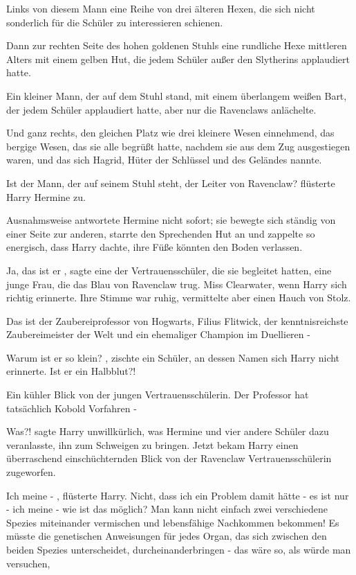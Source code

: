 Links von diesem Mann eine Reihe von drei älteren Hexen, die sich nicht
sonderlich für die Schüler zu interessieren schienen.

Dann zur rechten Seite des hohen goldenen Stuhls eine rundliche Hexe mittleren
Alters mit einem gelben Hut, die jedem Schüler außer den Slytherins applaudiert
hatte.

Ein kleiner Mann, der auf dem Stuhl stand, mit einem überlangem weißen Bart, der
jedem Schüler applaudiert hatte, aber nur die Ravenclaws anlächelte.

Und ganz rechts, den gleichen Platz wie drei kleinere Wesen einnehmend, das
bergige Wesen, das sie alle begrüßt hatte, nachdem sie aus dem Zug ausgestiegen
waren, und das sich Hagrid, Hüter der Schlüssel und des Geländes nannte.

\glqq Ist der Mann, der auf seinem Stuhl steht, der Leiter von Ravenclaw?\grqq{}
flüsterte Harry Hermine zu.

Ausnahmsweise antwortete Hermine nicht sofort; sie bewegte sich ständig von
einer Seite zur anderen, starrte den Sprechenden Hut an und zappelte so
energisch, dass Harry dachte, ihre Füße könnten den Boden verlassen.

\glqq Ja, das ist er\grqq{} , sagte eine der Vertrauensschüler, die sie
begleitet hatten, eine junge Frau, die das Blau von Ravenclaw trug. Miss
Clearwater, wenn Harry sich richtig erinnerte. Ihre Stimme war ruhig,
vermittelte aber einen Hauch von Stolz.

\glqq Das ist der Zaubereiprofessor von Hogwarts, Filius Flitwick, der
kenntnisreichste Zaubereimeister der Welt und ein ehemaliger Champion im
Duellieren -\grqq{}

\glqq Warum ist er so klein?\grqq{} , zischte ein Schüler, an dessen Namen sich
Harry nicht erinnerte. \glqq Ist er ein Halbblut?!\grqq{}

Ein kühler Blick von der jungen Vertrauensschülerin. \glqq Der Professor hat
tatsächlich Kobold Vorfahren -\grqq{}

\glqq Was?!\grqq{} sagte Harry unwillkürlich, was Hermine und vier andere
Schüler dazu veranlasste, ihn zum Schweigen zu bringen. Jetzt bekam Harry einen
überraschend einschüchternden Blick von der Ravenclaw Vertrauensschülerin
zugeworfen.

\glqq Ich meine -\grqq{} , flüsterte Harry. \glqq Nicht, dass ich ein Problem
damit hätte - es ist nur - ich meine - wie ist das möglich? Man kann nicht
einfach zwei verschiedene Spezies miteinander vermischen und lebensfähige
Nachkommen bekommen! Es müsste die genetischen Anweisungen für jedes Organ, das
sich zwischen den beiden Spezies unterscheidet, durcheinanderbringen - das wäre
so, als würde man versuchen,\grqq{}

